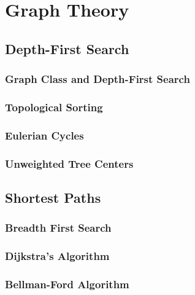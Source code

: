 \chapter{Graph Theory}

\section{Depth-First Search}
\setcounter{section}{1}
\setcounter{subsection}{0}
\subsection{Graph Class and Depth-First Search}

\subsection{Topological Sorting}

\subsection{Eulerian Cycles}

\subsection{Unweighted Tree Centers}


\section{Shortest Paths}
\setcounter{section}{2}
\setcounter{subsection}{0}
\subsection{Breadth First Search}

\subsection{Dijkstra's Algorithm}

\subsection{Bellman-Ford Algorithm}

